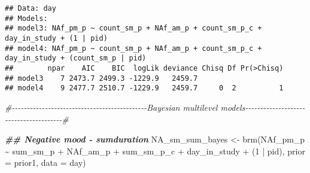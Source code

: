\documentclass[
]{article}
\newenvironment{Shaded}{\begin{snugshade}}{\end{snugshade}}
\newcommand{\AttributeTok}[1]{\textcolor[rgb]{0.77,0.63,0.00}{#1}}
\newcommand{\CommentTok}[1]{\textcolor[rgb]{0.56,0.35,0.01}{\textit{#1}}}
\newcommand{\DecValTok}[1]{\textcolor[rgb]{0.00,0.00,0.81}{#1}}
\newcommand{\DocumentationTok}[1]{\textcolor[rgb]{0.56,0.35,0.01}{\textbf{\textit{#1}}}}
\newcommand{\FunctionTok}[1]{\textcolor[rgb]{0.00,0.00,0.00}{#1}}
\newcommand{\NormalTok}[1]{#1}
\newcommand{\OtherTok}[1]{\textcolor[rgb]{0.56,0.35,0.01}{#1}}
\newcommand{\SpecialCharTok}[1]{\textcolor[rgb]{0.00,0.00,0.00}{#1}}
\begin{document}
\begin{verbatim}
## Data: day
## Models:
## model3: NAf_pm_p ~ count_sm_p + NAf_am_p + count_sm_p_c + day_in_study + (1 | pid)
## model4: NAf_pm_p ~ count_sm_p + NAf_am_p + count_sm_p_c + day_in_study + (count_sm_p | pid)
##        npar    AIC    BIC  logLik deviance Chisq Df Pr(>Chisq)
## model3    7 2473.7 2499.3 -1229.9   2459.7                    
## model4    9 2477.7 2510.7 -1229.9   2459.7     0  2          1
\end{verbatim}

\begin{Shaded}
\begin{Highlighting}[]
\CommentTok{\#{-}{-}{-}{-}{-}{-}{-}{-}{-}{-}{-}{-}{-}{-}{-}{-}{-}{-}{-}{-}{-}{-}{-}{-}{-}{-}{-}{-}{-}{-}{-}{-}{-}{-}{-}{-}{-}{-}{-}{-}{-}{-}{-}{-}{-}Bayesian multilevel models{-}{-}{-}{-}{-}{-}{-}{-}{-}{-}{-}{-}{-}{-}{-}{-}{-}{-}{-}{-}{-}{-}{-}{-}{-}{-}{-}{-}{-}{-}{-}{-}{-}{-}{-}{-}{-}{-}{-}\#}

\DocumentationTok{\#\# Negative mood {-} sumduration}
\NormalTok{NA\_sm\_sum\_bayes  }\OtherTok{\textless{}{-}} \FunctionTok{brm}\NormalTok{(NAf\_pm\_p }\SpecialCharTok{\textasciitilde{}}\NormalTok{ sum\_sm\_p }\SpecialCharTok{+}\NormalTok{ NAf\_am\_p }\SpecialCharTok{+}\NormalTok{ sum\_sm\_p\_c }\SpecialCharTok{+}\NormalTok{ day\_in\_study }\SpecialCharTok{+}\NormalTok{ (}\DecValTok{1} \SpecialCharTok{|}\NormalTok{ pid), }\AttributeTok{prior =}\NormalTok{ prior1, }\AttributeTok{data =}\NormalTok{ day)}
\end{Highlighting}
\end{Shaded}
\end{document}
